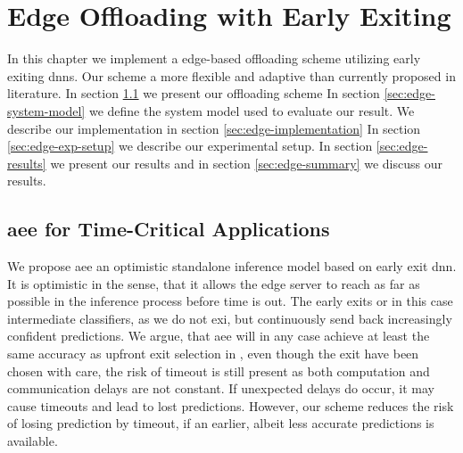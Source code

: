 \hypertarget{earlyexiting}{%
	\chapter{Edge Offloading with Early Exiting}\label{ch:edgeoffloading}}
\thispagestyle{fancy}

In this chapter we implement a edge-based offloading scheme utilizing early exiting \gls{dnn}s. Our scheme a more flexible and adaptive than currently proposed in literature. In section \ref{sec:edge-aee} we present our offloading scheme In section \ref{sec:edge-system-model} we define the system model used to evaluate our result. We describe our implementation in section \ref{sec:edge-implementation} In section \ref{sec:edge-exp-setup} we describe our experimental setup. In section \ref{sec:edge-results} we present our results and in section \ref{sec:edge-summary} we discuss our results.

\section{\acrfull{aee} for Time-Critical Applications} \label{sec:edge-aee}

We propose \acrfull{aee} an optimistic standalone inference model based on early exit \gls{dnn}. It is optimistic in the sense, that it allows the edge server to reach as far as possible in the inference process before time is out. The early exits or in this case intermediate classifiers, as we do not exi, but continuously send back increasingly confident predictions. We argue, that \gls{aee} will in any case achieve at least the same accuracy as upfront exit selection in \cite{li_edge_2018}, even though the exit have been chosen with care, the risk of timeout is still present as both computation and communication delays are not constant. If unexpected delays do occur, it may cause timeouts and lead to lost predictions. However, our scheme reduces the risk of losing prediction by timeout, if an earlier, albeit less accurate predictions is available. 

